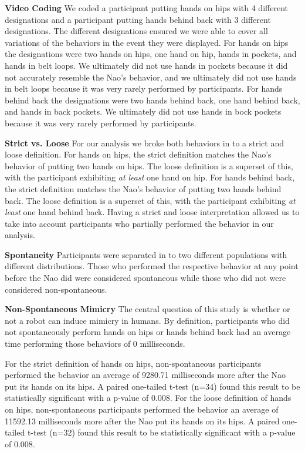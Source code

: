 \documentclass{acm_proc_article-sp}
\begin{document}
\textbf{Video Coding} We coded a participant putting hands on hips with 4 different designations and a participant putting hands behind back with 3 different designations. The different designations ensured we were able to cover all variations of the behaviors in the event they were displayed. For hands on hips the designations were two hands on hips, one hand on hip, hands in pockets, and hands in belt loops. We ultimately did not use hands in pockets because it did not accurately resemble the Nao's behavior, and we ultimately did not use hands in belt loops because it was very rarely performed by participants. For hands behind back the designations were two hands behind back, one hand behind back, and hands in back pockets. We ultimately did not use hands in bock pockets because it was very rarely performed by participants.
	
\textbf{Strict vs. Loose} For our analysis we broke both behaviors in to a strict and loose definition. For hands on hips, the strict definition matches the Nao's behavior of putting two hands on hips. The loose definition is a superset of this, with the participant exhibiting \textit{at least} one hand on hip. For hands behind back, the strict definition matches the Nao's behavior of putting two hands behind back. The loose definition is a superset of this, with the participant exhibiting \textit{at least} one hand behind back. Having a strict and loose interpretation allowed us to take into account participants who partially performed the behavior in our analysis. 

\textbf{Spontaneity} Participants were separated in to two different populations with different distributions. Those who performed the respective behavior at any point before the Nao did were considered spontaneous while those who did not were considered non-spontaneous.

\textbf{Non-Spontaneous Mimicry} The central question of this study is whether or not a robot can induce mimicry in humans. By definition, participants who did not spontaneously perform hands on hips or hands behind back had an average time performing those behaviors of 0 milliseconds. 

For the strict definition of hands on hips, non-spontaneous participants performed the behavior an average of 9280.71 milliseconds more after the Nao put its hands on its hips. A paired one-tailed t-test (n=34) found this result to be statistically significant with a p-value of 0.008. For the loose definition of hands on hips, non-spontaneous participants performed the behavior an average of 11592.13 milliseconds more after the Nao put its hands on its hips. A paired one-tailed t-test (n=32) found this result to be statistically significant with a p-value of 0.008. 
\end{document}
